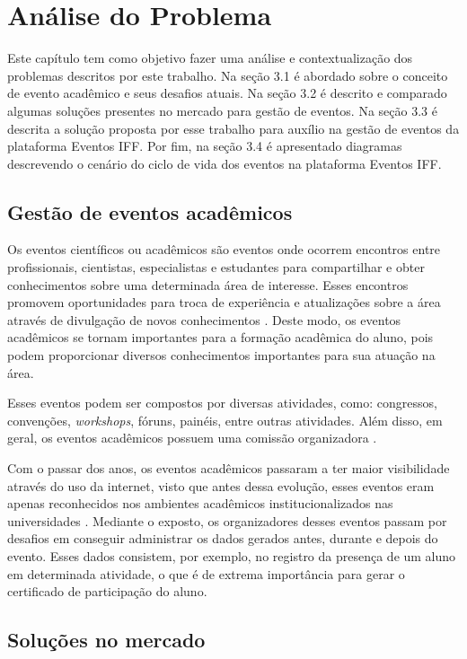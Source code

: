 \chapter{Análise do Problema}

Este capítulo tem como objetivo fazer uma análise e contextualização dos problemas descritos por este trabalho. Na seção 3.1 é abordado sobre o conceito de evento acadêmico e seus desafios atuais. Na seção 3.2 é descrito e comparado algumas soluções presentes no mercado para gestão de eventos. Na seção 3.3 é descrita a solução proposta por esse trabalho para auxílio na gestão de eventos da plataforma Eventos IFF. Por fim, na seção 3.4 é apresentado diagramas descrevendo o cenário do ciclo de vida dos eventos na plataforma Eventos IFF.

\section{Gestão de eventos acadêmicos}

Os eventos científicos ou acadêmicos são eventos onde ocorrem encontros entre profissionais, cientistas, especialistas e estudantes para compartilhar e obter conhecimentos sobre uma determinada área de interesse. Esses encontros promovem oportunidades para troca de experiência e atualizações sobre a área através de divulgação de novos conhecimentos \cite{lacerda}. Deste modo, os eventos acadêmicos se tornam importantes para a formação acadêmica do aluno, pois podem proporcionar diversos conhecimentos importantes para sua atuação na área.

Esses eventos podem ser compostos por diversas atividades, como: congressos, convenções, \textit{workshops}, fóruns, painéis, entre outras atividades. Além disso, em geral, os eventos acadêmicos possuem uma comissão organizadora \cite{araujo}.

Com o passar dos anos, os eventos acadêmicos passaram a ter maior visibilidade através do uso da internet, visto que antes dessa evolução, esses eventos eram apenas reconhecidos nos ambientes acadêmicos institucionalizados nas universidades \cite{araujo}. Mediante o exposto, os organizadores desses eventos passam por desafios em conseguir administrar os dados gerados antes, durante e depois do evento. Esses dados consistem, por exemplo, no registro da presença de um aluno em determinada atividade, o que é de extrema importância para gerar o certificado de participação do aluno.

\section{Soluções no mercado}

